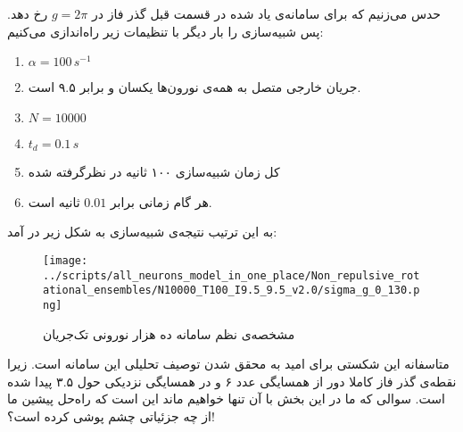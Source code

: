 حدس می‌زنیم که برای سامانه‌ی یاد شده در قسمت قبل گذر فاز در 
$g = 2\pi$
رخ دهد. پس شبیه‌سازی را بار دیگر با تنظیمات زیر راه‌اندازی می‌کنیم:

\begin{tcolorbox}[colback=green!5!white,colframe=green!75!black]
	\begin{enumerate}[*]
		\item
		$\alpha = 100\, s^{-1}$
		\item
		جریان خارجی متصل به همه‌ی نورون‌ها یکسان و برابر ۹.۵ است.
		\item
		$N = 10000$
		\item
		$t_d = 0.1\, s$ 
		\item 
		کل زمان شبیه‌سازی ۱۰۰ ثانیه در نظرگرفته شده
		\item 
		هر گام زمانی برابر $0.01$ ثانیه است.
	\end{enumerate}
\end{tcolorbox}
به این ترتیب نتیجه‌ی شبیه‌سازی به شکل زیر در آمد:
\begin{figure}[h]
	\centering
	\texttt{[image: ../scripts/all\_neurons\_model\_in\_one\_place/Non\_repulsive\_rotational\_ensembles/N10000\_T100\_I9.5\_9.5\_v2.0/sigma\_g\_0\_130.png]}
	\caption{مشخصه‌ی نظم سامانه ده هزار نورونی تک‌جریان}
	\label{fig:sigma_non_repulsive_single_input}
\end{figure}
متاسفانه این شکستی برای امید به محقق شدن توصیف تحلیلی این سامانه است. زیرا نقطه‌ی گذر فاز کاملا دور از همسایگی عدد ۶ و در همسایگی نزدیکی حول ۳.۵ پیدا شده است. سوالی که ما در این بخش با آن تنها خواهیم ماند این است که راه‌حل پیشین ما از چه جزئیاتی چشم پوشی کرده است؟!

